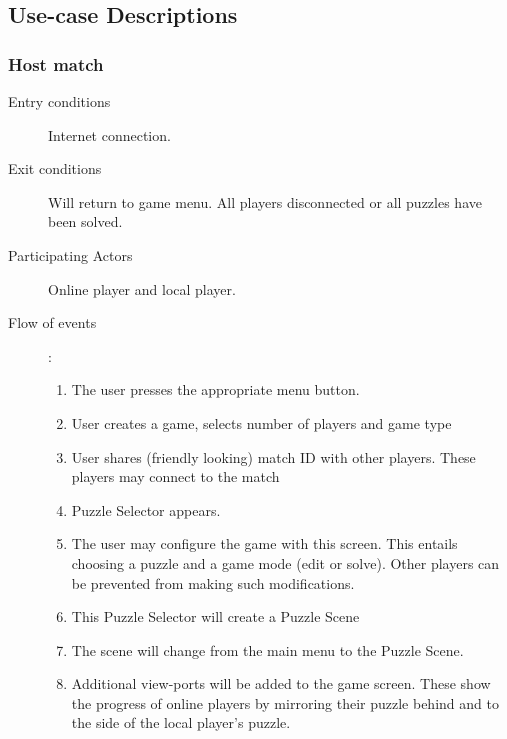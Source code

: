 \documentclass[12pt]{article}
\begin{document}
\subsection{Use-case Descriptions}
\begin{mdframed}
    \subsubsection{Host match}
    \begin{description}
        \item[Entry conditions] Internet connection.
        \item[Exit conditions] Will return to game menu. All players
            disconnected or all puzzles have been solved.
        \item[Participating Actors] Online player and local player.
        \item[Flow of events]:
            \begin{enumerate}
                \item The user presses the appropriate menu button.
                \item User creates a game, selects number of players and game
                    type

                \item User shares (friendly looking) match ID with other
                    players. These players may connect to the match
                \item Puzzle Selector appears.
                \item The user may configure the game with this screen.
                    This
                    entails choosing a puzzle and a game mode (edit or solve).
                    Other players can be prevented from making such
                    modifications.
                \item This Puzzle Selector will create a Puzzle Scene
                \item The scene will change from the main menu to the Puzzle
                    Scene.
                \item Additional view-ports will be added to the game screen.
                These show the progress of online players by mirroring their
                puzzle behind and to the side of the local player's puzzle.

            \end{enumerate}
    \end{description}
\end{mdframed}
\end{document}
